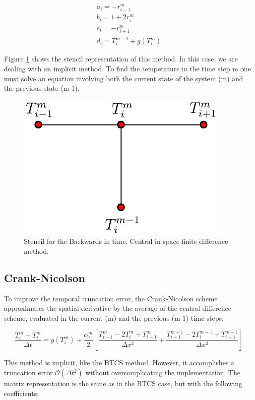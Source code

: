 \begin{equation}
    \begin{gathered}
        a_i = -r^m_{i-1} \\
    b_i = 1 + 2r^m_{i}\\
    c_i = - r^m_{i+1} \\
    d_i = T^{m-1}_i + g(T_i^m)
    \end{gathered}
\end{equation}

Figure \ref{fig:StensilBTCS} shows the stencil representation of this method. In this case, we are dealing with an implicit method. To find the temperature in the time step m one must solve an equation involving both the current state of the system (m) and the previous state (m-1). 

\begin{figure}[h]
    \centering
    \includegraphics[width=0.35\columnwidth]{Stencils_FiniteDifferences/BTCS.pdf}
    \caption{Stencil for the Backwards in time, Central in space finite difference method.}
    \label{fig:StensilBTCS}
\end{figure}

\subsection{Crank-Nicolson}

To improve the temporal truncation error, the Crank-Nicolson scheme approximates the spatial derivative by the average of the central difference scheme, evaluated in the current (m) and the previous (m-1) time steps: 

\begin{equation}
    \frac{T^m_i - T^m_i}{\Delta t} = g(T^m_i) + \frac{\alpha^m_i}{2}\left[ 
          \frac{T^m_{i-1}- 2 T^m_i + T_{i+1}^m}{\Delta x^2} + \frac{T^{m-1}_{i-1}-2T^{m-1}_i+T_{i+1}^{m-1}}{\Delta x^2}
    \right] 
\end{equation}

This method is implicit, like the BTCS method. However, it accomplishes a truncation error $\mathcal{O}(\Delta t^2)$ without overcomplicating the implementation. The matrix representation is the same as in the BTCS case, but with the following coefficients:

